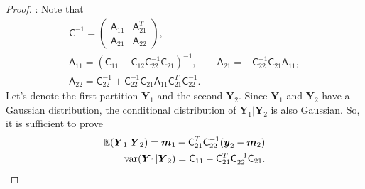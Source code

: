 \documentclass[smallextended]{svjour3}       %
\newcommand{\bm}[1]{\boldsymbol{#1}}
\newcommand{\Ex}{\mathbb{E}}
\newcommand{\vm}{\bm{m}}
\newcommand{\vy}{\bm{y}}
\newcommand{\vY}{\bm{Y}}
\newcommand{\mA}{\mathsf{A}}
\newcommand{\mC}{\mathsf{C}}
\newcommand{\var}{{\textup{var}}}
\begin{document}
\begin{proof}:
Note that
	\begin{gather*}
	\mC^{-1} = \begin{pmatrix} \mA_{11} & \mA_{21}^T \\ \mA_{21} & \mA_{22} \end{pmatrix}, \\
	\mA_{11} = (\mC_{11} - \mC_{12} \mC_{22}^{-1} \mC_{21})^{-1}, \qquad 
	\mA_{21} = -  \mC_{22}^{-1} \mC_{21} \mA_{11}, \\ 
	\mA_{22} = \mC_{22}^{-1} + \mC_{22}^{-1} \mC_{21} \mA_{11} \mC_{21}^T \mC_{22}^{-1}.
	\end{gather*}
%
%
Let's denote the first partition $\vY_1$ and the second $\vY_2$. 
Since $\vY_1$ and $\vY_2$ have a Gaussian distribution, the conditional distribution of $\vY_1 \vert \vY_2$ is also Gaussian. So, it is sufficient to prove 
\begin{align*}
\Ex(\vY_1 \vert \vY_2) = \vm_1 + \mC_{21}^T \mC_{22}^{-1}(\vy_2 - \vm_2)
\\
\var(\vY_1 \vert \vY_2) = \mC_{11} - \mC_{21}^T \mC_{22}^{-1} \mC_{21}.
\end{align*}



\end{proof}
\end{document}

